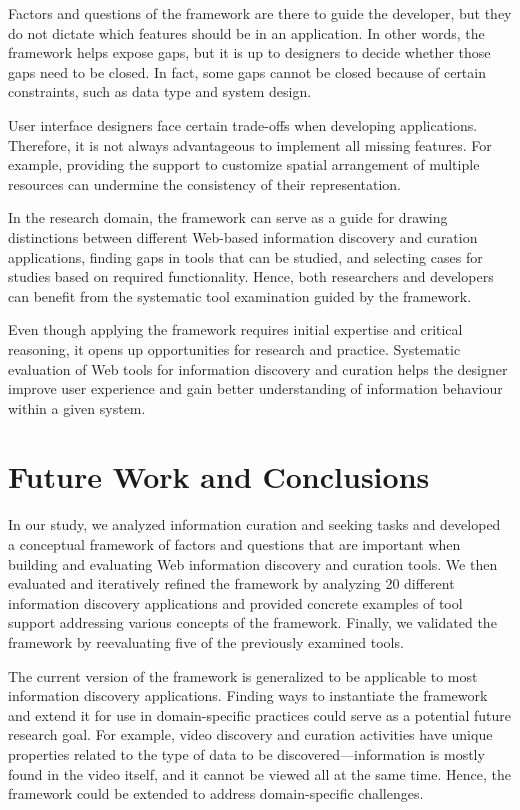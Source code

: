 \documentclass{sigchi}
\begin{document}
Factors and questions of the framework are there to guide the developer, but they do not dictate which features should be in an application. In other words, the framework helps expose gaps, but it is up to designers to decide whether those gaps need to be closed. In fact, some gaps cannot be closed because of certain constraints, such as data type and system design.

User interface designers face certain trade-offs when developing applications. Therefore, it is not always advantageous to implement all missing features. For example, providing the support to customize spatial arrangement of multiple resources can undermine the consistency of their representation. 

In the research domain, the framework can serve as a guide for drawing distinctions between different Web-based information discovery and curation applications, finding gaps in tools that can be studied, and selecting cases for studies based on required functionality. Hence, both researchers and developers can benefit from the systematic tool examination guided by the framework.

Even though applying the framework requires initial expertise and critical reasoning, it opens up opportunities for research and practice. Systematic evaluation of Web tools for information discovery and curation helps the designer improve user experience and gain better understanding of information behaviour within a given system. 

\section{Future Work and Conclusions}
\label{section:future_work}
In our study, we analyzed information curation and seeking tasks and developed a conceptual framework of factors and questions that are important when building and evaluating Web information discovery and curation tools. We then evaluated and iteratively refined the framework by analyzing 20 different information discovery applications and provided concrete examples of tool support addressing various concepts of the framework. Finally, we validated the framework by reevaluating five of the previously examined tools.

The current version of the framework is generalized to be applicable to most information discovery applications. Finding ways to instantiate the framework and extend it for use in domain-specific practices could serve as a potential future research goal. For example, video discovery and curation activities have unique properties related to the type of data to be discovered---information is mostly found in the video itself, and it cannot be viewed all at the same time. Hence, the framework could be extended to address domain-specific challenges. 
\end{document}
